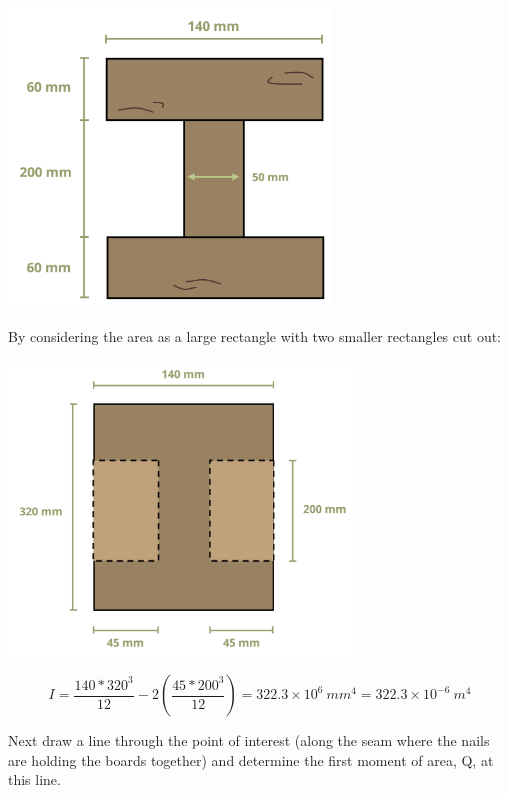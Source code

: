 \documentclass[
  letterpaper,
  DIV=11,
  numbers=noendperiod]{scrreprt}
\theoremstyle{definition}
\theoremstyle{remark}
\begin{document}
\begin{tcolorbox}
\begin{tcolorbox}
\begin{center}
\includegraphics[width=3.375in,height=\textheight]{images/CH10 PNGs/example 10.5 part 2.png}
\end{center}

By considering the area as a large rectangle with two smaller rectangles
cut out:

\begin{center}
\includegraphics[width=3.59375in,height=\textheight]{images/CH10 PNGs/example 10.5 part 3.png}
\end{center}

\[
I=\frac{140 * 320^3}{12}-2\left(\frac{45 * 200^3}{12}\right)=322.3 \times 10^6{~mm}^4=322.3 \times 10^{-6}{~m}^4
\]

Next draw a line through the point of interest (along the seam where the
nails are holding the boards together) and determine the first moment of
area, Q, at this line.


\end{tcolorbox}
\end{tcolorbox}
\end{document}
